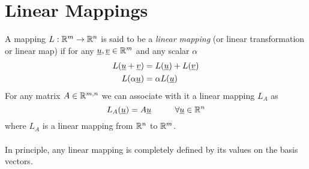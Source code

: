 \chapter{Linear Mappings}
\begin{definition}
A mapping $L:\mathbb{R}^m\to\mathbb{R}^n$ is said to be a \textit{linear mapping} (or linear transformation or linear map) if for any $\underline{u},\underline{v}\in\mathbb{R}^m$ and any scalar $\alpha$
\begin{align*}
L(\underline{u}+\underline{v}) &= L(\underline{u})+L(\underline{v}) \\
L(\alpha\underline{u})&= \alpha L(\underline{u})
\end{align*}
For any matrix $A\in\mathbb{R}^{m,n}$ we can associate with it a linear mapping $L_A$ as
\[
L_A(\uv)=A\uv \hspace{10mm} \forall\uv\in\R^n
\]
where $L_A$ is a linear mapping from $\mathbb{R}^n$ to $\mathbb{R}^m$.\\ \\
In principle, any linear mapping is completely defined by its values on the basis vectors.
\end{definition}

